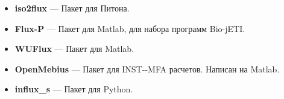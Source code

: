 \documentclass[14pt, a4paper]{extreport}
\begin{document}
\begin{appendices}
\begin{itemize}
		\item \textbf{iso2flux} --- Пакет для Питона\cite{p13CMFA}.
		
		\item \textbf{Flux-P} --- Пакет для Matlab, для набора программ Bio-jETI\cite{Flux-P}.
		
		\item \textbf{WUFlux} --- Пакет для Matlab\cite{WUFlux}.
		
		\item \textbf{OpenMebius} --- Пакет для INST--MFA расчетов. Написан на Matlab\cite{OpenMebius}.
		
		\item \textbf{influx\_s} --- Пакет для Python\cite{influxs}.
	\end{itemize}
	
\end{appendices}
\end{document}
